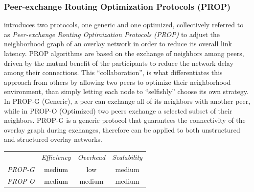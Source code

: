 \subsubsection{Peer-exchange Routing Optimization Protocols (PROP)}
\cite{QCYCZ2007} introduces two protocols, one generic and one optimized,
collectively referred to as \emph{Peer-exchange Routing Optimization Protocols
(PROP)} to adjust the neighborhood graph of an overlay network in order to
reduce its overall link latency. PROP algorithms are based on the exchange of
neighbors among peers, driven by the mutual benefit of the participants to
reduce the network delay among their connections. This ``collaboration'', is
what differentiates this approach from others by allowing two peers to optimize
their neighborhood environment, than simply letting each node to ``selfishly''
choose its own strategy. In PROP-G (Generic), a peer can exchange all of its
neighbors with another peer, while in PROP-O (Optimized) two peers exchange a
selected subset of their neighbors. PROP-G is a generic protocol that guarantees
the connectivity of the overlay graph during exchanges, therefore can be applied
to both unstructured and structured overlay networks.

\begin{center}
\begin{tabular}{rccc}
\multicolumn{1}{r}{} &
\multicolumn{1}{c}{\emph{Efficiency}} &
\multicolumn{1}{c}{\emph{Overhead}} &
\multicolumn{1}{c}{\emph{Scalability}}
\\
\cline{2-4}
\emph{PROP-G} &
medium &
low &
medium \\
\emph{PROP-O} &
medium &
medium &
medium \\
\end{tabular}
\end{center}


